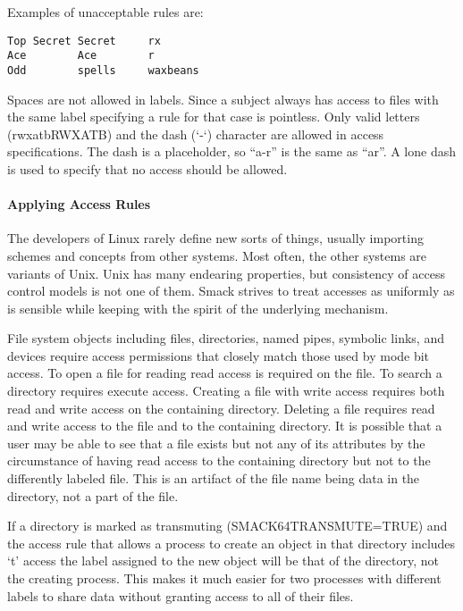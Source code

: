 \documentclass[a4paper,8pt,english]{sphinxmanual}
\begin{document}
Examples of unacceptable rules are:

\begin{Verbatim}[commandchars=\\\{\}]
Top Secret Secret     rx
Ace        Ace        r
Odd        spells     waxbeans
\end{Verbatim}

Spaces are not allowed in labels. Since a subject always has access to files
with the same label specifying a rule for that case is pointless. Only
valid letters (rwxatbRWXATB) and the dash (`-`) character are allowed in
access specifications. The dash is a placeholder, so ``a-r'' is the same
as ``ar''. A lone dash is used to specify that no access should be allowed.


\paragraph{Applying Access Rules}
\label{admin-guide/LSM/Smack:applying-access-rules}
The developers of Linux rarely define new sorts of things, usually importing
schemes and concepts from other systems. Most often, the other systems are
variants of Unix. Unix has many endearing properties, but consistency of
access control models is not one of them. Smack strives to treat accesses as
uniformly as is sensible while keeping with the spirit of the underlying
mechanism.

File system objects including files, directories, named pipes, symbolic links,
and devices require access permissions that closely match those used by mode
bit access. To open a file for reading read access is required on the file. To
search a directory requires execute access. Creating a file with write access
requires both read and write access on the containing directory. Deleting a
file requires read and write access to the file and to the containing
directory. It is possible that a user may be able to see that a file exists
but not any of its attributes by the circumstance of having read access to the
containing directory but not to the differently labeled file. This is an
artifact of the file name being data in the directory, not a part of the file.

If a directory is marked as transmuting (SMACK64TRANSMUTE=TRUE) and the
access rule that allows a process to create an object in that directory
includes `t' access the label assigned to the new object will be that
of the directory, not the creating process. This makes it much easier
for two processes with different labels to share data without granting
access to all of their files.
\end{document}
